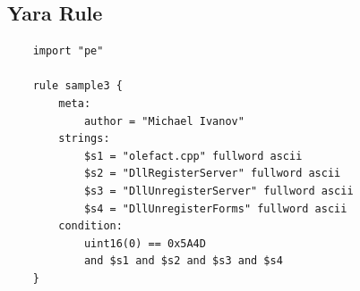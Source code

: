 \documentclass{article}
\begin{document}
    \subsection{Yara Rule}
    \begin{verbatim}
    import "pe"
    
    rule sample3 {
        meta:
            author = "Michael Ivanov"
        strings:
            $s1 = "olefact.cpp" fullword ascii
            $s2 = "DllRegisterServer" fullword ascii
            $s3 = "DllUnregisterServer" fullword ascii
            $s4 = "DllUnregisterForms" fullword ascii
        condition:
            uint16(0) == 0x5A4D
            and $s1 and $s2 and $s3 and $s4
    }
    \end{verbatim}
    \pagebreak
    \printbibliography
\end{document}
